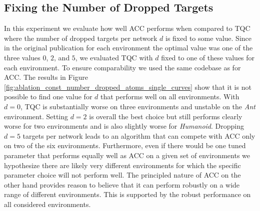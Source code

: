 \subsection{Fixing the Number of Dropped Targets}



In this experiment we evaluate how well ACC performs when compared to TQC where the number of dropped targets per network $d$ is fixed to some value.
Since in the original publication for each environment the optimal value was one of the three values $0$, $2$, and $5$, we evaluated TQC with $d$ fixed to one of these values for each environment.
To ensure comparability we used the same codebase as for ACC. 
The results in Figure \ref{fig:ablation_const_number_dropped_atoms_single_curves} show that it is not possible to find one value for $d$ that performs well on all environments.
With $d=0$, TQC is substantially worse on three environments and unstable on the \textit{Ant} environment.
Setting $d=2$ is overall the best choice but still performs clearly worse for two environments and is also slightly worse for \textit{Humanoid}.
Dropping $d=5$ targets per network leads to an algorithm that can compete with ACC only on two of the six environments.
Furthermore, even if there would be one tuned parameter that performs equally well as ACC on a given set of environments we hypothesize there are likely very different environments for which the specific parameter choice will not perform well. The principled nature of ACC on the other hand provides reason to believe that it can perform robustly on a wide range of different environments. This is supported by the robust performance on all considered environments.











